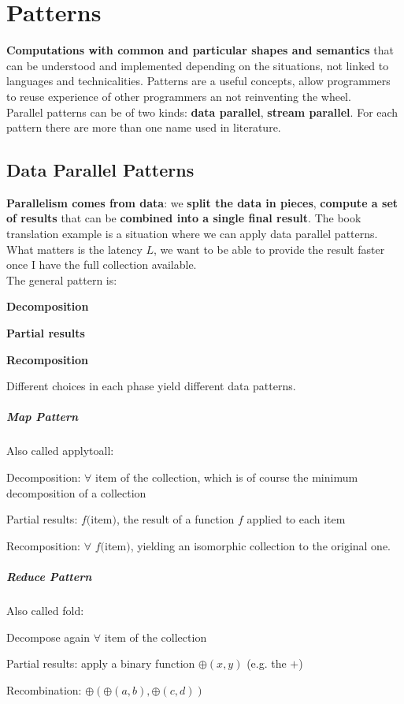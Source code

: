\documentclass[10pt]{report}
\begin{document}
\section{Patterns}
\textbf{Computations with common and particular shapes and semantics} that can be understood and implemented depending on the situations, not linked to languages and technicalities. Patterns are a useful concepts, allow programmers to reuse experience of other programmers an not reinventing the wheel.\\
Parallel patterns can be of two kinds: \textbf{data parallel}, \textbf{stream parallel}. For each pattern there are more than one name used in literature.
\subsection{Data Parallel Patterns}
\textbf{Parallelism comes from data}: we \textbf{split the data in pieces}, \textbf{compute a set of results} that can be \textbf{combined into a single final result}. The book translation example is a situation where we can apply data parallel patterns. What matters is the latency $L$, we want to be able to provide the result faster once I have the full collection available.\\
The general pattern is:
\begin{list}{}{}
	\item \textbf{Decomposition}
	\item \textbf{Partial results}
	\item \textbf{Recomposition}
\end{list}
Different choices in each phase yield different data patterns.
\begin{multicols}{2}
\subparagraph{Map Pattern} Also called applytoall:\begin{list}{}{}
	\item Decomposition: $\forall$ item of the collection, which is of course the minimum decomposition of a collection
	\item Partial results: $f($item$)$, the result of a function $f$ applied to each item
	\item Recomposition: $\forall$ $f($item$)$, yielding an isomorphic collection to the original one.
\end{list}
\subparagraph{Reduce Pattern} Also called fold:\begin{list}{}{}
	\item Decompose again $\forall$ item of the collection
	\item Partial results: apply a binary function $\oplus(x,y)$ (e.g. the $+$)
	\item Recombination: $\oplus(\oplus(a,b),\oplus(c,d))$
\end{list}
\end{multicols}
\end{document}
